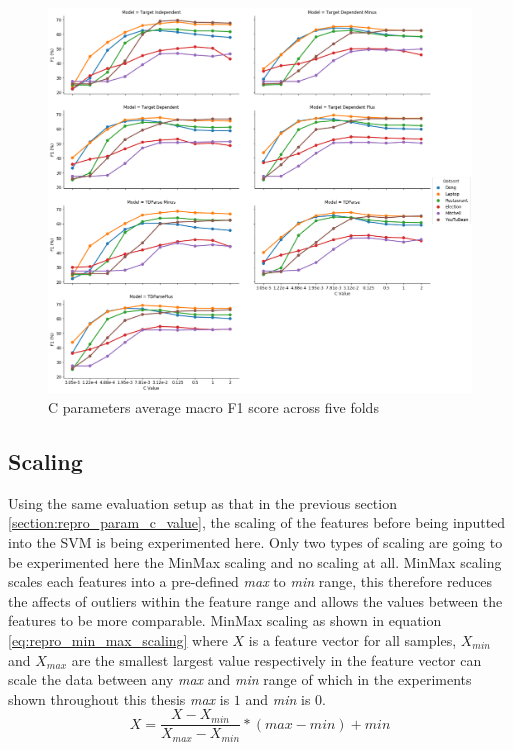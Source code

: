 \begin{figure}[!htb]
    \centering
    \includegraphics[scale=0.3]{images/reproducibility/Parameters/C_Parameter/C_F1_Plot.png}
    \caption{C parameters average macro F1 score across five folds}
    \label{fig:repro_param_avg_f1}
\end{figure}

\newpage
\FloatBarrier
\subsection{Scaling}
Using the same evaluation setup as that in the previous section \ref{section:repro_param_c_value}, the scaling of the features before being inputted into the SVM is being experimented here. Only two types of scaling are going to be experimented here the MinMax scaling and no scaling at all. MinMax scaling scales each features into a pre-defined \textit{max} to \textit{min} range, this therefore reduces the affects of outliers within the feature range and allows the values between the features to be more comparable. MinMax scaling as shown in equation \ref{eq:repro_min_max_scaling} where $X$ is a feature vector for all samples, $X_{min}$ and $X_{max}$ are the smallest largest value respectively in the feature vector can scale the data between any \textit{max} and \textit{min} range of which in the experiments shown throughout this thesis \textit{max} is $1$ and \textit{min} is $0$.
\begin{equation}
    X = \frac{X - X_{min}}{X_{max} - X_{min}} * (max - min) + min
    \label{eq:repro_min_max_scaling}
\end{equation}

